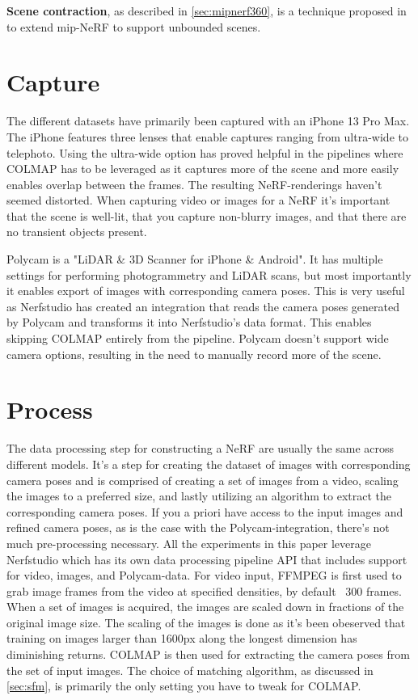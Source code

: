 \textbf{Scene contraction}, as described in \autoref{sec:mipnerf360}, is a technique proposed in \cite{barronMipNeRF360Unbounded2022} to extend mip-NeRF to support unbounded scenes.

\section{Capture}
The different datasets have primarily been captured with an iPhone 13 Pro Max. The iPhone features three lenses that enable captures ranging from ultra-wide to telephoto. Using the ultra-wide option has proved helpful in the pipelines where COLMAP has to be leveraged as it captures more of the scene and more easily enables overlap between the frames. The resulting NeRF-renderings haven't seemed distorted. When capturing video or images for a NeRF it's important that the scene is well-lit, that you capture non-blurry images, and that there are no transient objects present.

Polycam is a "LiDAR \& 3D Scanner for iPhone \& Android". It has multiple settings for performing photogrammetry and LiDAR scans, but most importantly it enables export of images with corresponding camera poses. This is very useful as Nerfstudio has created an integration that reads the camera poses generated by Polycam and transforms it into Nerfstudio's data format. This enables skipping COLMAP entirely from the pipeline. Polycam doesn't support wide camera options, resulting in the need to manually record more of the scene.

\section{Process}
The data processing step for constructing a NeRF are usually the same across different models. It's a step for creating the dataset of images with corresponding camera poses and is comprised of creating a set of images from a video, scaling the images to a preferred size, and lastly utilizing an algorithm to extract the corresponding camera poses. If you a priori have access to the input images and refined camera poses, as is the case with the Polycam-integration, there's not much pre-processing necessary. All the experiments in this paper leverage Nerfstudio which has its own data processing pipeline API that includes support for video, images, and Polycam-data. For video input, FFMPEG\cite{tomar2006converting} is first used to grab image frames from the video at specified densities, by default ~300 frames. When a set of images is acquired, the images are scaled down in fractions of the original image size. The scaling of the images is done as it's been obeserved that training on images larger than 1600px along the longest dimension has diminishing returns. COLMAP is then used for extracting the camera poses from the set of input images. The choice of matching algorithm, as discussed in \autoref{sec:sfm}, is primarily the only setting you have to tweak for COLMAP.

